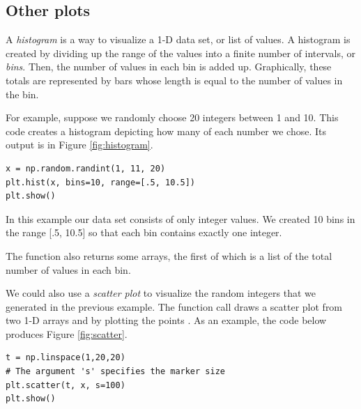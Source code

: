 \subsection*{Other plots}
A \emph{histogram} is a way to visualize a 1-D data set, or list of values. 
A histogram is created by dividing up the range of the values into a finite number of intervals, or \emph{bins}.
Then, the number of values in each bin is added up.
Graphically, these totals are represented by bars whose length is equal to the number of values in the bin.

For example, suppose we randomly choose 20 integers between 1 and 10.
This code creates a histogram depicting how many of each number we chose.
Its output is in Figure \ref{fig:histogram}.

\begin{lstlisting}
x = np.random.randint(1, 11, 20)
plt.hist(x, bins=10, range=[.5, 10.5])
plt.show()
\end{lstlisting}

In this example our data set  consists of only integer values.
We created 10 bins in the range [.5, 10.5] so that each bin contains exactly one integer.

The function  also returns some arrays, the first of which is a list of the total number of values in each bin.

We could also use a \emph{scatter plot} to visualize the random integers  that we generated in the previous example. 
The  function call  draws a scatter plot from two 1-D arrays  and  by plotting the points .
As an example, the code below produces Figure \ref{fig:scatter}.

\begin{lstlisting}
t = np.linspace(1,20,20)
# The argument 's' specifies the marker size
plt.scatter(t, x, s=100)
plt.show()
\end{lstlisting}


